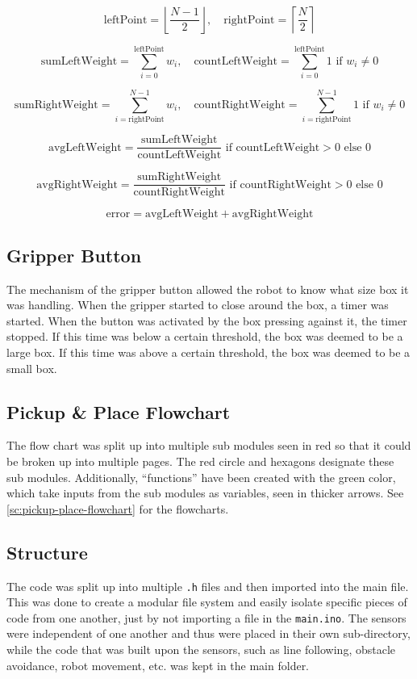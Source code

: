 \documentclass[11pt]{report}
\begin{document}
\[
\text{leftPoint} = \left\lfloor \frac{N-1}{2} \right\rfloor, \quad \text{rightPoint} = \left\lceil \frac{N}{2} \right\rceil
\]

\[
\text{sumLeftWeight} = \sum_{i=0}^{\text{leftPoint}} w_i, \quad \text{countLeftWeight} = \sum_{i=0}^{\text{leftPoint}} 1 \text{ if } w_i \neq 0
\]

\[
\text{sumRightWeight} = \sum_{i=\text{rightPoint}}^{N-1} w_i, \quad \text{countRightWeight} = \sum_{i=\text{rightPoint}}^{N-1} 1 \text{ if } w_i \neq 0
\]

\[
\text{avgLeftWeight} = \frac{\text{sumLeftWeight}}{\text{countLeftWeight}} \text{ if } \text{countLeftWeight} > 0 \text{ else } 0
\]

\[
\text{avgRightWeight} = \frac{\text{sumRightWeight}}{\text{countRightWeight}} \text{ if } \text{countRightWeight} > 0 \text{ else } 0
\]

\[
\text{error} = \text{avgLeftWeight} + \text{avgRightWeight}
\]

\subsection{Gripper Button}
The mechanism of the gripper button allowed the robot to know what size box it was handling. When the gripper started to close around the box, a timer was started. When the button was activated by the box pressing against it, the timer stopped. If this time was below a certain threshold, the box was deemed to be a large box. If this time was above a certain threshold, the box was deemed to be a small box. 

\subsection{Pickup \& Place Flowchart}

The flow chart was split up into multiple sub modules seen in red so that it could be broken up into multiple pages. The red circle and hexagons designate these sub modules. Additionally, ``functions'' have been created with the green color, which take inputs from the sub modules as variables, seen in thicker arrows. See \cref{sc:pickup-place-flowchart} for the flowcharts.

\subsection{Structure}

The code was split up into multiple \texttt{.h} files and then imported into the main file. This was done to create a modular file system and easily isolate specific pieces of code from one another, just by not importing a file in the \texttt{main.ino}. The sensors were independent of one another and thus were placed in their own sub-directory, while the code that was built upon the sensors, such as line following, obstacle avoidance, robot movement, etc. was kept in the main folder.
\end{document}
